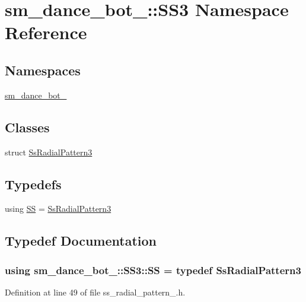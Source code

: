 \hypertarget{namespacesm__dance__bot__3_1_1SS3}{}\section{sm\+\_\+dance\+\_\+bot\+\_\+:\+:S\+S3 Namespace Reference}
\label{namespacesm__dance__bot__3_1_1SS3}
\subsection*{Namespaces}
\begin{DoxyCompactItemize}
\item 
 \hyperlink{namespacesm__dance__bot__3_1_1SS3_1_1sm__dance__bot__3}{sm\+\_\+dance\+\_\+bot\+\_}
\end{DoxyCompactItemize}
\subsection*{Classes}
\begin{DoxyCompactItemize}
\item 
struct \hyperlink{structsm__dance__bot__3_1_1SS3_1_1SsRadialPattern3}{Ss\+Radial\+Pattern3}
\end{DoxyCompactItemize}
\subsection*{Typedefs}
\begin{DoxyCompactItemize}
\item 
using \hyperlink{namespacesm__dance__bot__3_1_1SS3_a1980df51e516f1d0f9191faabf472409}{SS} = \hyperlink{structsm__dance__bot__3_1_1SS3_1_1SsRadialPattern3}{Ss\+Radial\+Pattern3}
\end{DoxyCompactItemize}


\subsection{Typedef Documentation}
\subsubsection[{\texorpdfstring{SS}{SS}}]{\setlength{\rightskip}{0pt plus 5cm}using {\bf sm\+\_\+dance\+\_\+bot\+\_\+::\+S\+S3\+::\+SS} = typedef {\bf Ss\+Radial\+Pattern3}}\hypertarget{namespacesm__dance__bot__3_1_1SS3_a1980df51e516f1d0f9191faabf472409}{}\label{namespacesm__dance__bot__3_1_1SS3_a1980df51e516f1d0f9191faabf472409}


Definition at line 49 of file ss\+\_\+radial\+\_\+pattern\+\_.\+h.

